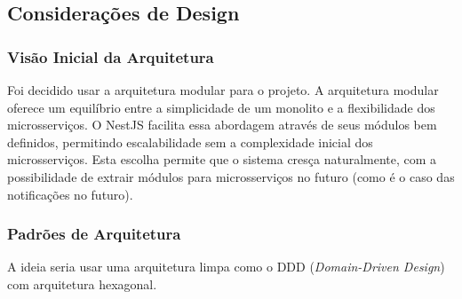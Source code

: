\documentclass[12pt, a4paper]{article}
\begin{document}
\subsection{Considerações de Design}

\subsubsection{Visão Inicial da Arquitetura}
\begin{spacing}{1.5}
Foi decidido usar a arquitetura modular para o projeto. A arquitetura modular oferece um equilíbrio entre a simplicidade de um monolito e a flexibilidade dos microsserviços. O NestJS facilita essa abordagem através de seus módulos bem definidos, permitindo escalabilidade sem a complexidade inicial dos microsserviços. Esta escolha permite que o sistema cresça naturalmente, com a possibilidade de extrair módulos para microsserviços no futuro (como é o caso das notificações no futuro).
\end{spacing}

\subsubsection{Padrões de Arquitetura}
\begin{spacing}{1.5}
A ideia seria usar uma arquitetura limpa como o DDD (\textit{Domain-Driven Design}) com arquitetura hexagonal.
\end{spacing}
\end{document}
